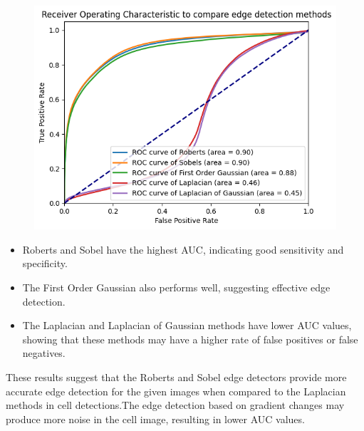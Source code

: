 \documentclass[11pt]{article}
\begin{document}
\begin{figure}[h]
\begin{minipage}{0.3\textwidth}
    \end{minipage}\hfill
    \begin{minipage}{0.3\textwidth}
        \centering
        \includegraphics[width=\textwidth]{../img/task4_ROC3.png}
    \end{minipage}\hfill
\end{figure}

\begin{itemize}
    \item Roberts and Sobel have the highest AUC, indicating good sensitivity and specificity.
    \item The First Order Gaussian also performs well, suggesting effective edge detection.
    \item The Laplacian and Laplacian of Gaussian methods have lower AUC values, showing that these methods may have a higher rate of false positives or false negatives.
\end{itemize}

These results suggest that the Roberts and Sobel edge detectors provide more accurate edge detection for the given images when compared to the Laplacian methods in cell detections.The edge detection based on gradient changes may produce more noise in the cell image, resulting in lower AUC values.
\end{document}
